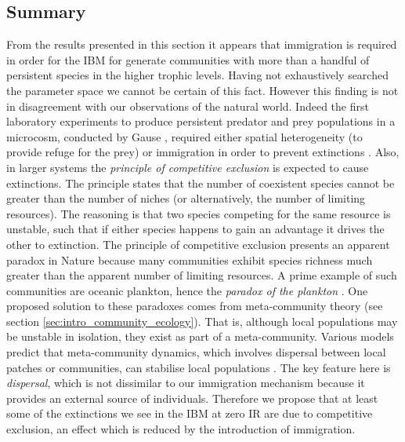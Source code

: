 \subsection{Summary}
\label{sec:disucss_persitence}

From the results presented in this section it appears that immigration is required in order for the IBM for generate communities with more than a handful of persistent species in the higher trophic levels. Having not exhaustively searched the parameter space we cannot be certain of this fact. However this finding is not in disagreement with our observations of the natural world. Indeed the first laboratory experiments to produce persistent predator and prey populations in a microcosm, conducted by Gause \cite{gause1934experimental}, required either spatial heterogeneity (to provide refuge for the prey) or immigration in order to prevent extinctions \cite{desharnais2005population}. Also, in larger systems the \emph{principle of competitive exclusion} is expected to cause extinctions. The principle states that the number of coexistent species cannot be greater than the number of niches (or alternatively, the number of limiting resources). The reasoning is that two species competing for the same resource is unstable, such that if either species happens to gain an advantage it drives the other to extinction. The principle of competitive exclusion presents an apparent paradox in Nature because many communities exhibit species richness much greater than the apparent number of limiting resources. A prime example of such communities are oceanic plankton, hence the \emph{paradox of the plankton} \cite{hutchinson1961paradox}. One proposed solution to these paradoxes comes from meta-community theory (see section \ref{sec:intro_community_ecology}). That is, although local populations may be unstable in isolation, they exist as part of a meta-community. Various models predict that meta-community dynamics, which involves dispersal between local patches or communities, can stabilise local populations \cite{holyoak1996persistence}. The key feature here is \emph{dispersal}, which is not dissimilar to our immigration mechanism because it provides an external source of individuals. Therefore we propose that at least some of the extinctions we see in the IBM at zero IR are due to competitive exclusion, an effect which is reduced by the introduction of immigration. 


